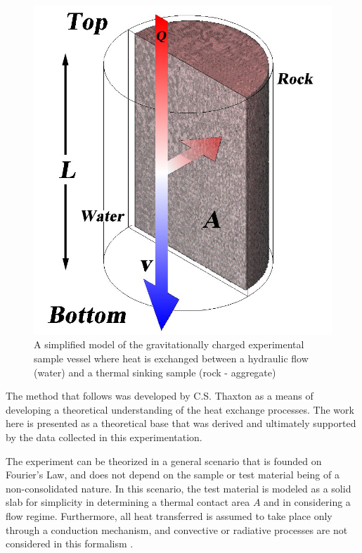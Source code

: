 \begin{figure}
\label{slab}
\begin{center}
\includegraphics[scale=.25]{theorySlab.jpg}
\caption{A simplified model of the gravitationally charged experimental sample vessel where heat is exchanged between a hydraulic flow (water) and a thermal sinking sample (rock - aggregate)}
\end{center}
\end{figure}

The method that follows was developed by C.S. Thaxton as a means of developing a theoretical understanding of the heat exchange processes. The work here is presented as a theoretical base that was derived and ultimately supported by the data collected in this experimentation. 

The experiment can be theorized in a general scenario that is founded on Fourier's Law, and does not depend on the sample or test material being of a non-consolidated nature. In this scenario, the test material is modeled as a solid slab for simplicity in determining a thermal contact area $A$ and in considering a flow regime. Furthermore, all heat transferred is assumed to take place only through a conduction mechanism, and convective or radiative processes are not considered in this formalism \cite{theoryKern}.


